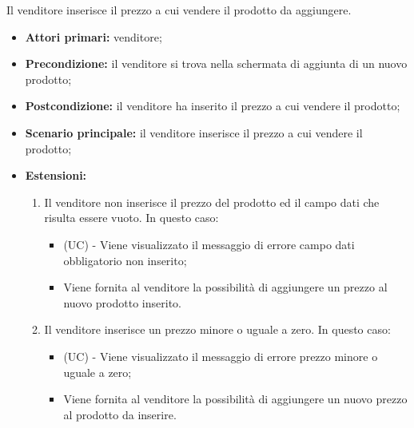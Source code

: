 Il venditore inserisce il prezzo a cui vendere il prodotto da aggiungere.
\begin{itemize}
    \item \textbf{Attori primari:} venditore;
    \item \textbf{Precondizione:} il venditore si trova nella schermata di aggiunta di un nuovo prodotto;
    \item \textbf{Postcondizione:} il venditore ha inserito il prezzo a cui vendere il prodotto;
    \item \textbf{Scenario principale:} il venditore inserisce il prezzo a cui vendere il prodotto;
    \item \textbf{Estensioni:}
    \begin{enumerate}[label=\lett]
    	\item Il venditore non inserisce il prezzo del prodotto ed il campo dati che risulta essere vuoto. In questo caso:
    	\begin{itemize}
    		\item (UC) - Viene visualizzato il messaggio di errore campo dati obbligatorio non inserito;
    		\item Viene fornita al venditore la possibilità di aggiungere un prezzo al nuovo prodotto inserito.
    	\end{itemize}
    	\item Il venditore inserisce un prezzo minore o uguale a zero. In questo caso:
    	\begin{itemize}
    		\item (UC) - Viene visualizzato il messaggio di errore prezzo minore o uguale a zero;
    		\item Viene fornita al venditore la possibilità di aggiungere un nuovo prezzo al prodotto da inserire.
    	\end{itemize}
    \end{enumerate}
\end{itemize}

